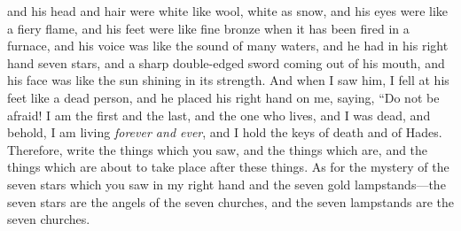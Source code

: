 \begin{biblechapter}
\verse and his head and hair were white like wool, white as snow, and his eyes were like a fiery flame,
\verse and his feet were like fine bronze when it has been fired in a furnace, and his voice was like the sound of many waters,
\verse and he had in his right hand seven stars, and a sharp double-edged sword coming out of his mouth, and his face was like the sun shining in its strength.
\verse And when I saw him, I fell at his feet like a dead person, and he placed his right hand on me, saying, “Do not be afraid! I am the first and the last,
\verse and the one who lives, and I was dead, and behold, I am living \textit{forever and ever}, and I hold the keys of death and of Hades.
\verse Therefore, write the things which you saw, and the things which are, and the things which are about to take place after these things.
\verse As for the mystery of the seven stars which you saw in my right hand and the seven gold lampstands—the seven stars are the angels of the seven churches, and the seven lampstands are the seven churches.
\end{biblechapter}

